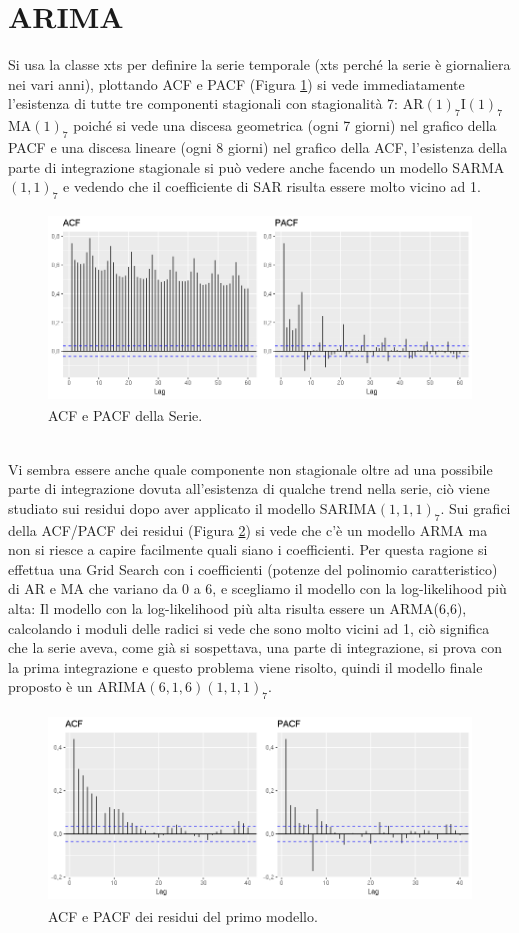 \documentclass[12pt, onecolumn]{article}
\begin{document}
\section*{ARIMA}
Si usa la classe xts per definire la serie temporale (xts perché la serie è giornaliera nei vari anni), plottando ACF e PACF (Figura \ref{fig:ACF_1}) si vede immediatamente l'esistenza di tutte tre componenti stagionali con stagionalità 7: AR$(1)_7$I$(1)_7$MA$(1)_7$ poiché si vede una discesa geometrica (ogni 7 giorni) nel grafico della PACF e una discesa lineare (ogni 8 giorni) nel grafico della ACF, l'esistenza della parte di integrazione stagionale si può vedere anche facendo un modello SARMA$(1,1)_7$ e vedendo che il coefficiente di SAR risulta essere molto vicino ad 1. 
\begin{figure}[!h]
  \centering
  \includegraphics[width=\linewidth,height=5cm]{imgs/ACF_1.png}
  \caption{ACF e PACF della Serie.}
  \label{fig:ACF_1}
\end{figure}\\
Vi sembra essere anche quale componente non stagionale oltre ad una possibile parte di integrazione dovuta all'esistenza di qualche trend nella serie, ciò viene studiato sui residui dopo aver applicato il modello SARIMA$(1,1,1)_7$.
Sui grafici della ACF/PACF dei residui (Figura \ref{fig:ACF_2}) si vede che c'è un modello ARMA ma non si riesce a capire facilmente quali siano i coefficienti.
Per questa ragione si effettua una Grid Search con i coefficienti (potenze del polinomio caratteristico) di AR e MA che variano da 0 a 6, e scegliamo il modello con la log-likelihood più alta: Il modello con la log-likelihood più alta risulta essere un ARMA(6,6), calcolando i moduli delle radici si vede che sono molto vicini ad 1, ciò significa che la serie aveva, come già si sospettava,  una parte di integrazione, si prova con la prima integrazione e questo problema viene risolto, quindi il modello finale proposto è un ARIMA$(6,1,6)(1,1,1)_7$.\\
\begin{figure}[!h]
  \centering
  \includegraphics[width=\linewidth,height=5cm]{imgs/ACF_2.png}
  \caption{ACF e PACF dei residui del primo modello.}
  \label{fig:ACF_2}
\end{figure}
\end{document}
